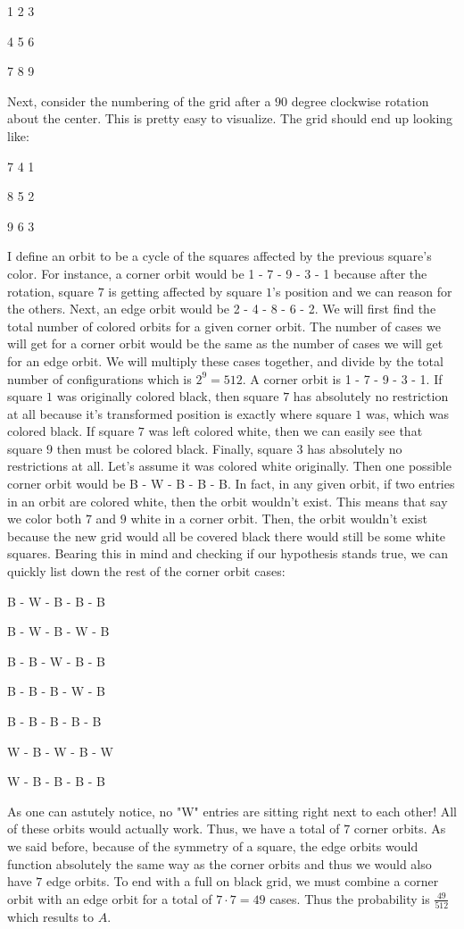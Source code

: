 \begin{enumerate}
 1 2 3

 4 5 6

 7 8 9

 Next, consider the numbering of the grid after a $90$ degree clockwise rotation about the center. This is pretty easy to visualize. The grid should end up looking like:

 7 4 1

 8 5 2

 9 6 3

 I define an orbit to be a cycle of the squares affected by the previous square's color. For instance, a corner orbit would be 1 - 7 - 9 - 3 - 1 because after the rotation, square $7$ is getting affected by square $1$'s position and we can reason for the others. Next, an edge orbit would be 2 - 4 - 8 - 6 - 2. We will first find the total number of colored orbits for a given corner orbit. The number of cases we will get for a corner orbit would be the same as the number of cases we will get for an edge orbit. We will multiply these cases together, and divide by the total number of configurations which is $2^{9} = 512$. A corner orbit is 1 - 7 - 9 - 3 - 1. If square $1$ was originally colored black, then square $7$ has absolutely no restriction at all because it's transformed position is exactly where square $1$ was, which was colored black. If square $7$ was left colored white, then we can easily see that square $9$ then must be colored black. Finally, square $3$ has absolutely no restrictions at all. Let's assume it was colored white originally. Then one possible corner orbit would be B - W - B - B - B. In fact, in any given orbit, if two entries in an orbit are colored white, then the orbit wouldn't exist. This means that say we color both $7$ and $9$ white in a corner orbit. Then, the orbit wouldn't exist because the new grid would all be covered black there would still be some white squares. Bearing this in mind and checking if our hypothesis stands true, we can quickly list down the rest of the corner orbit cases:

 B - W - B - B - B

 B - W - B - W - B

 B - B - W - B - B

 B - B - B - W - B

 B - B - B - B - B

 W - B - W - B - W

 W - B - B - B - B

 As one can astutely notice, no "W" entries are sitting right next to each other! All of these orbits would actually work. Thus, we have a total of $7$ corner orbits. As we said before, because of the symmetry of a square, the edge orbits would function absolutely the same way as the corner orbits and thus we would also have $7$ edge orbits. To end with a full on black grid, we must combine a corner orbit with an edge orbit for a total of $7 \cdot 7 = 49$ cases. Thus the probability is $\frac{49}{512}$ which results to $\boxed{A}$. 


\end{enumerate}
